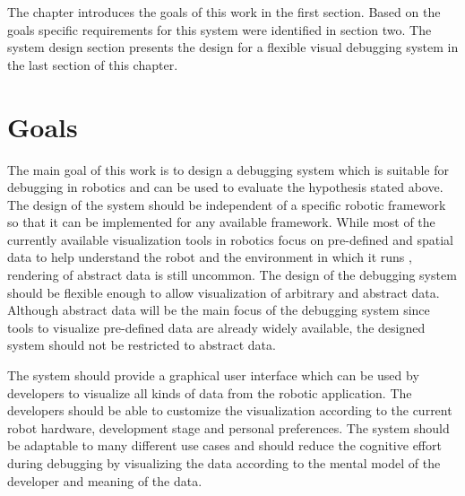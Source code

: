 The chapter introduces the goals of this work in the first section. Based on the goals specific requirements for this system were identified in section two. The system design section presents the design for a flexible visual debugging system in the last section of this chapter.






\section{Goals}
The main goal of this work is to design a debugging system which is suitable for debugging in robotics and can be used to evaluate the hypothesis stated above. The design of the system should be independent of a specific robotic framework so that it can be implemented for any available framework.
While most of the currently available visualization tools in robotics focus on pre-defined and spatial data to help understand the robot and the environment in which it runs \cite{Collett2010, Quigley2009}, rendering of abstract data is still uncommon. The design of the debugging system should be flexible enough to allow visualization of arbitrary and abstract data. Although abstract data will be the main focus of the debugging system since tools to visualize pre-defined data are already widely available, the designed system should not be restricted to abstract data.

The system should provide a graphical user interface which can be used by developers to visualize all kinds of data from the robotic application. The developers should be able to customize the visualization according to the current robot hardware, development stage and personal preferences. The system should be adaptable to many different use cases and should reduce the cognitive effort during debugging by visualizing the data according to the mental model of the developer and meaning of the data.

